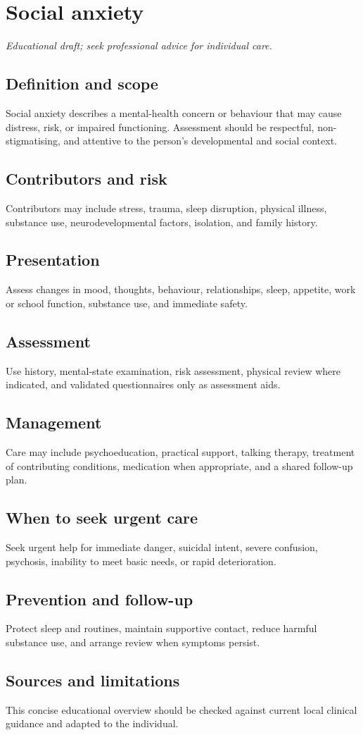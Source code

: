 \chapter{Social anxiety}
\medskip
\noindent\textit{Educational draft; seek professional advice for individual care.}

\section*{Definition and scope}
Social anxiety describes a mental-health concern or behaviour that may cause distress, risk, or impaired functioning. Assessment should be respectful, non-stigmatising, and attentive to the person’s developmental and social context.

\section*{Contributors and risk}
Contributors may include stress, trauma, sleep disruption, physical illness, substance use, neurodevelopmental factors, isolation, and family history.

\section*{Presentation}
Assess changes in mood, thoughts, behaviour, relationships, sleep, appetite, work or school function, substance use, and immediate safety.

\section*{Assessment}
Use history, mental-state examination, risk assessment, physical review where indicated, and validated questionnaires only as assessment aids.

\section*{Management}
Care may include psychoeducation, practical support, talking therapy, treatment of contributing conditions, medication when appropriate, and a shared follow-up plan.

\section*{When to seek urgent care}
Seek urgent help for immediate danger, suicidal intent, severe confusion, psychosis, inability to meet basic needs, or rapid deterioration.

\section*{Prevention and follow-up}
Protect sleep and routines, maintain supportive contact, reduce harmful substance use, and arrange review when symptoms persist.

\section*{Sources and limitations}
This concise educational overview should be checked against current local clinical guidance and adapted to the individual.
